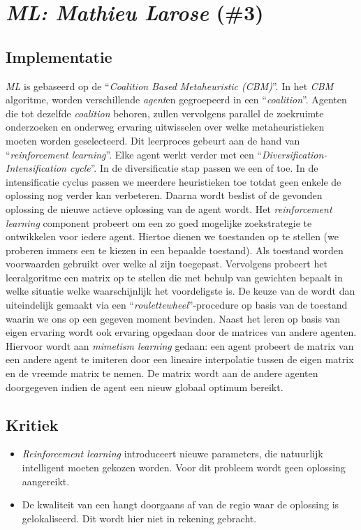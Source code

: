 \section{\emph{ML: Mathieu Larose} (\#3)}
\label{sss:ml}
\subsection{Implementatie}
\emph{ML}\cite{chesc-ml} is gebaseerd op de \abmh{} ``\emph{Coalition Based Metaheuristic (CBM)}''\cite{chesc-ml2}. In het \emph{CBM} algoritme, worden verschillende \emph{agent}en gegroepeerd in een ``\emph{coalition}''. Agenten die tot dezelfde \emph{coalition} behoren, zullen vervolgens parallel de zoekruimte onderzoeken en onderweg ervaring uitwisselen over welke metaheuristieken moeten worden geselecteerd. Dit leerproces gebeurt aan de hand van ``\emph{reinforcement learning}''\cite{rlaiacaml}. Elke agent werkt verder met een ``\emph{Diversification-Intensification cycle}''. In de diversificatie stap passen we een \abmt{} of \abrr{} \abllh{} toe. In de intensificatie cyclus passen we meerdere \abls{} heuristieken toe totdat geen enkele \abls{} \abh{} de oplossing nog verder kan verbeteren. Daarna wordt beslist of de gevonden oplossing de nieuwe actieve oplossing van de agent wordt. Het \emph{reinforcement learning} component probeert om een zo goed mogelijke zoekstrategie te ontwikkelen voor iedere agent. Hiertoe dienen we toestanden op te stellen (we proberen immers een \abh{} te kiezen in een bepaalde toestand). Als toestand worden voorwaarden gebruikt over welke \abllhn{} al zijn toegepast. Vervolgens probeert het leeralgoritme een matrix op te stellen die met behulp van gewichten bepaalt in welke situatie welke \abh{} waarschijnlijk het voordeligste is. De keuze van de \abh{} wordt dan uiteindelijk gemaakt via een ``\emph{roulettewheel}''-procedure\cite{DBLP:journals/corr/abs-1109-3627} op basis van de toestand waarin we ons op een gegeven moment bevinden. Naast het leren op basis van eigen ervaring wordt ook ervaring opgedaan door de matrices van andere agenten. Hiervoor wordt aan \emph{mimetism learning}\cite{655072} gedaan: een agent probeert de matrix van een andere agent te imiteren door een lineaire interpolatie tussen de eigen matrix en de vreemde matrix te nemen. De matrix wordt aan de andere agenten doorgegeven indien de agent een nieuw globaal optimum bereikt.
\subsection{Kritiek}
\begin{itemize}
 \item \emph{Reinforcement learning} introduceert nieuwe parameters, die natuurlijk intelligent moeten gekozen worden. Voor dit probleem wordt geen oplossing aangereikt.
 \item De kwaliteit van een \abllh{} hangt doorgaans af van de regio waar de oplossing is gelokaliseerd. Dit wordt hier niet in rekening gebracht.
\end{itemize}